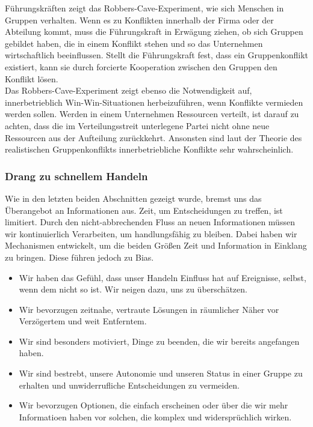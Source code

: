 Führungskräften zeigt das Robbers-Cave-Experiment, wie sich Menschen in Gruppen verhalten. Wenn es zu Konflikten innerhalb der Firma oder der Abteilung kommt, muss die Führungskraft in Erwägung ziehen, ob sich Gruppen gebildet haben, die in einem Konflikt stehen und so das Unternehmen wirtschaftlich beeinflussen. Stellt die Führungskraft fest, dass ein Gruppenkonflikt existiert, kann sie durch forcierte Kooperation zwischen den Gruppen den Konflikt lösen. \\

Das Robbers-Cave-Experiment zeigt ebenso die Notwendigkeit auf, innerbetrieblich Win-Win-Situationen herbeizuführen, wenn Konflikte vermieden werden sollen. Werden in einem Unternehmen Ressourcen verteilt, ist darauf zu achten, dass die im Verteilungsstreit unterlegene Partei nicht ohne neue Ressourcen aus der Aufteilung zurückkehrt. Ansonsten sind laut der Theorie des realistischen Gruppenkonflikts innerbetriebliche Konflikte sehr wahrscheinlich.

\subsubsection{Drang zu schnellem Handeln}
Wie in den letzten beiden Abschnitten gezeigt wurde, bremst uns das Überangebot an Informationen aus. Zeit, um Entscheidungen zu treffen, ist limitiert. Durch den nicht-abbrechenden Fluss an neuen Informationen müssen wir kontinuierlich Verarbeiten, um handlungsfähig zu bleiben. Dabei haben wir Mechanismen entwickelt, um die beiden Größen Zeit und Information in Einklang zu bringen. Diese führen jedoch zu Bias.

\begin{itemize}
	\item Wir haben das Gefühl, dass unser Handeln Einfluss hat auf Ereignisse, selbst, wenn dem nicht so ist. Wir neigen dazu, uns zu überschätzen. \cite{KRU99}
	\item Wir bevorzugen zeitnahe, vertraute Lösungen in räumlicher Näher vor Verzögertem und weit Entferntem. \cite{GRU15}
	\item Wir sind besonders motiviert, Dinge zu beenden, die wir bereits angefangen haben.\cite{MOO01}
	\item Wir sind bestrebt, unsere Autonomie und unseren Status in einer Gruppe zu erhalten und unwiderrufliche Entscheidungen zu vermeiden. \cite{JOS94}
	\item Wir bevorzugen Optionen, die einfach erscheinen oder über die wir mehr Informatioen haben vor solchen, die komplex und widersprüchlich wirken.\cite{FRI88}
\end{itemize}

